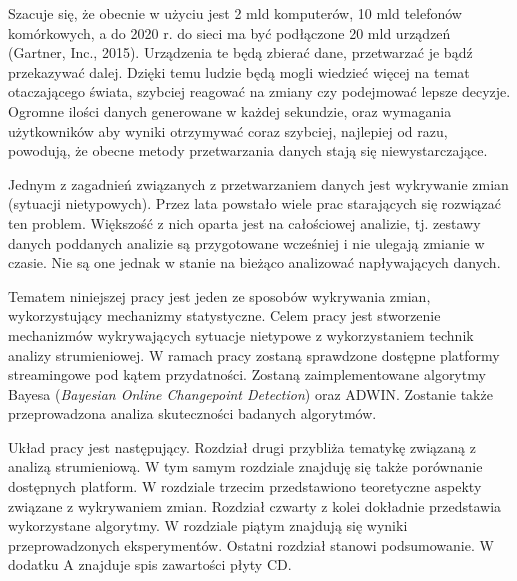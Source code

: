 Szacuje się,
że obecnie w użyciu jest 2 mld komputerów,
10 mld telefonów komórkowych,
a do 2020 r. do sieci ma być podłączone 20 mld urządzeń (Gartner, Inc., 2015).
Urządzenia te będą zbierać dane,
przetwarzać je
bądź przekazywać dalej.
Dzięki temu ludzie będą mogli wiedzieć więcej na temat otaczającego świata,
szybciej reagować na zmiany
czy podejmować lepsze decyzje.
Ogromne ilości danych generowane w każdej sekundzie,
oraz wymagania użytkowników aby wyniki otrzymywać coraz szybciej,
najlepiej od razu,
powodują,
że obecne metody przetwarzania danych stają się niewystarczające.

Jednym z zagadnień związanych z przetwarzaniem danych jest wykrywanie zmian (sytuacji nietypowych).
Przez lata powstało wiele prac starających się rozwiązać ten problem.
Większość z nich oparta jest na całościowej analizie,
tj. zestawy danych poddanych analizie są przygotowane wcześniej i nie ulegają zmianie w czasie.
Nie są one jednak w stanie na bieżąco analizować napływających danych.

Tematem niniejszej pracy jest jeden ze sposobów wykrywania zmian,
wykorzystujący mechanizmy statystyczne.
Celem pracy jest stworzenie mechanizmów wykrywających sytuacje nietypowe
z wykorzystaniem technik analizy strumieniowej.
W ramach pracy zostaną sprawdzone dostępne platformy streamingowe pod kątem przydatności.
Zostaną zaimplementowane algorytmy Bayesa (\textit{Bayesian Online Changepoint Detection})
oraz ADWIN.
Zostanie także przeprowadzona analiza skuteczności badanych algorytmów.

Układ pracy jest następujący.
Rozdział drugi przybliża tematykę związaną z analizą strumieniową.
W tym samym rozdziale znajduję się także porównanie dostępnych platform.
W rozdziale trzecim przedstawiono teoretyczne aspekty związane z wykrywaniem zmian.
Rozdział czwarty z kolei dokładnie przedstawia wykorzystane algorytmy.
W rozdziale piątym znajdują się wyniki przeprowadzonych eksperymentów.
Ostatni rozdział stanowi podsumowanie.
W dodatku A znajduje spis zawartości płyty CD.
